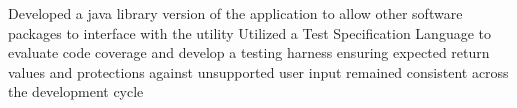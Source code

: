 {%
Developed a java library version of the application to allow other software packages to interface with the utility
}%
{%
Utilized a Test Specification Language to evaluate code coverage and develop a testing harness ensuring expected return values and protections against unsupported user input remained consistent across the development cycle
}%
%
%
%
%
%
%
%
%